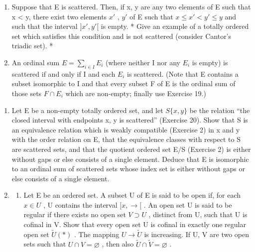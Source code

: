 \begin{enumerate}
\def\labelenumi{(\alph{enumi})}
\item
  Suppose that E is scattered. Then, if x, y are any two elements of E such that x \textless{} y, there exist two elements \(x'\) , \(y'\) of E such that \(x \leqslant x' < y' \leqslant y\) and such that the interval \(]x', y'[\) is empty. * Give an example of a totally ordered set which satisfies this condition and is not scattered (consider Cantor's triadic set). *
\item
  An ordinal sum \(E = \sum_{i \in I} E_i\) (where neither I nor any \(E_i\) is empty) is scattered if and only if I and each \(E_i\) is scattered. (Note that E contains a subset isomorphic to I and that every subset F of E is the ordinal sum of those sets \(F \cap E_i\) which are non-empty; finally use Exercise 19.)
\end{enumerate}

\begin{enumerate}
\def\labelenumi{\arabic{enumi}.}
\setcounter{enumi}{20}
\item
  Let E be a non-empty totally ordered set, and let \(S\{x,y\}\) be the relation ``the closed interval with endpoints x, y is scattered'' (Exercise 20). Show that S is an equivalence relation which is weakly compatible (Exercise 2) in x and y with the order relation on E, that the equivalence classes with respect to S are scattered sets, and that the quotient ordered set E/S (Exercise 2) is either without gaps or else consists of a single element. Deduce that E is isomorphic to an ordinal sum of scattered sets whose index set is either without gaps or else consists of a single element.
\item
  \begin{enumerate}
  \def\labelenumii{(\alph{enumii})}
  \tightlist
  \item
    Let E be an ordered set. A subset U of E is said to be open if, for each \(x \in U\) , U contains the interval \([x, \rightarrow[\) . An open set U is said to be regular if there exists no open set \(V \supset U\) , distinct from U, such that U is cofinal in V. Show that every open set U is cofinal in exactly one regular open set \(\tilde{U} (*)\) . The mapping \(U \to \tilde{U}\) is increasing. If U, V are two open sets such that \(U \cap V = \varnothing\) , then also \(\tilde{U} \cap \tilde{V} = \varnothing\) .
  \end{enumerate}
\end{enumerate}

